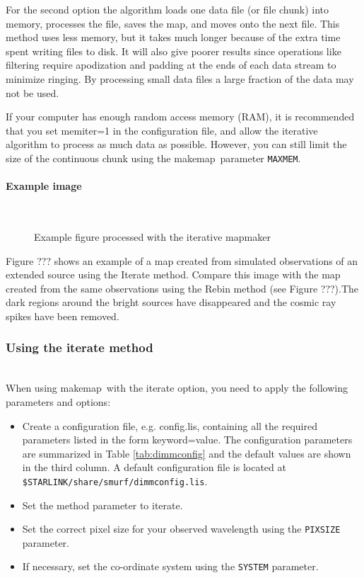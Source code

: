 \documentclass[twoside,11pt]{article}
\newcommand{\xref}[3]{#1}
\renewcommand{\_}{\texttt{\symbol{95}}}
\newcommand{\task}[1]{\textsf{#1}}
\newcommand{\makemap}{\xref{\task{makemap}}{sun258}{MAKEMAP}}
\newcommand{\aparam}[1]{\texttt{#1}}     %
\begin{document}
For the second option the algorithm loads one data file (or file
chunk) into memory, processes the file, saves the map, and moves onto
the next file. This method uses less memory, but it takes much longer
because of the extra time spent writing files to disk. It will also
give poorer results since operations like filtering require
apodization and padding at the ends of each data stream to minimize
ringing. By processing small data files a large fraction of the data
may not be used.

If your computer has enough random access memory (RAM), it is
recommended that you set memiter=1 in the configuration file, and
allow the iterative algorithm to process as much data as
possible. However, you can still limit the size of the continuous
chunk using the \makemap\ parameter \aparam{MAXMEM}.

\paragraph{Example image} \ \\

\begin{figure}
\caption{Example figure processed with the iterative mapmaker}
\end{figure}

Figure ??? shows an example of a map created from simulated observations
of an extended source using the Iterate method. Compare this image
with the map created from the same observations using the Rebin method
(see Figure ???).The dark regions around the bright sources have
disappeared and the cosmic ray spikes have been removed.


\subsubsection{Using the iterate method} \ \\

When using \makemap\ with the iterate option, you need to apply the
following parameters and options:

\begin{itemize}
\item Create a configuration file, e.g. config.lis, containing all the
  required parameters listed in the form keyword=value. The
  configuration parameters are summarized in Table \ref{tab:dimmconfig}
  and the default values are shown in the third column. A default 
  configuration file is located at 
  \texttt{\$STARLINK/share/smurf/dimmconfig.lis}.
\item Set the method parameter to iterate.
\item Set the correct pixel size for your observed wavelength using
  the \aparam{PIXSIZE} parameter.
\item If necessary, set the co-ordinate system using the \aparam{SYSTEM}
  parameter.
\end{itemize}
\end{document}
